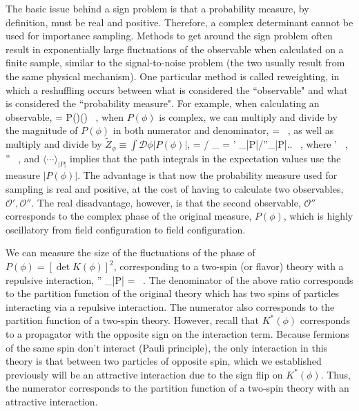 The basic issue behind a sign problem is that a probability measure, by definition, must be real and positive. Therefore, a complex determinant cannot be used for importance sampling. Methods to get around the sign problem often result in exponentially large fluctuations of the observable when calculated on a finite sample, similar to the signal-to-noise problem (the two usually result from the same physical mechanism). One particular method is called reweighting, in which a reshuffling occurs between what is considered the ``observable" and what is considered the ``probability measure". For example, when calculating an observable,
\beq
{} \rangle = \phi P(\phi){}(\phi) \ ,
\eeq
when $P(\phi)$ is complex, we can multiply and divide by the magnitude of $P(\phi)$ in both numerator and denominator,
\beq
{} \rangle =  \ ,
\eeq
as well as multiply and divide by $\tilde{Z}_{\phi} \equiv \int {\mathcal{ D}} \phi |P(\phi)|$,
\beq
\label{eq:reweight}
 \rangle = \left/ {_{\phi}} = ' \rangle_{|P|}\left/''\rangle_{|P|}\right.\right. \ ,
\eeq
where
\beq
{}' \equiv {} \ , '' \equiv {} \ ,
\eeq
and $\langle \cdots \rangle_{|P|}$ implies that the path integrals in the expectation values use the measure $|P(\phi)|$. The advantage is that now the probability measure used for sampling is real and positive, at the cost of having to calculate two observables, ${\mathcal{ O}}', {\mathcal{ O}}''$. The real disadvantage, however, is that the second observable, ${\mathcal{ O}}''$ corresponds to the complex phase of the original measure, $P(\phi)$, which is highly oscillatory from field configuration to field configuration. 

We can measure the size of the fluctuations of the phase of $P(\phi)= \left[\det K(\phi)\right]^2$, corresponding to a two-spin (or flavor) theory with a repulsive interaction,
\beq
{}'' \rangle_{|P|} =  \ .
\eeq
The denominator of the above ratio corresponds to the partition function of the original theory which has two spins of particles interacting via a repulsive interaction. The numerator also corresponds to the partition function of a two-spin theory. However, recall that $K^*(\phi)$ corresponds to a propagator with the opposite sign on the interaction term. Because fermions of the same spin don't interact (Pauli principle), the only interaction in this theory is that between two particles of opposite spin, which we established previously will be an attractive interaction due to the sign flip on $K^*(\phi)$. Thus, the numerator corresponds to the partition function of a two-spin theory with an attractive interaction. 


